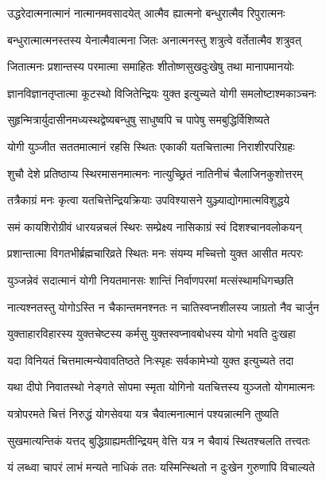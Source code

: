 \twolineshloka
{उद्धरेदात्मनात्मानं नात्मानमवसादयेत्}
{आत्मैव ह्यात्मनो बन्धुरात्मैव रिपुरात्मनः}%

\twolineshloka
{बन्धुरात्मात्मनस्तस्य येनात्मैवात्मना जितः}
{अनात्मनस्तु शत्रुत्वे वर्तेतात्मैव शत्रुवत्}%

\twolineshloka
{जितात्मनः प्रशान्तस्य परमात्मा समाहितः}
{शीतोष्णसुखदुःखेषु तथा मानापमानयोः}%

\twolineshloka
{ज्ञानविज्ञानतृप्तात्मा कूटस्थो विजितेन्द्रियः}
{युक्त इत्युच्यते योगी समलोष्टाश्मकाञ्चनः}%

\twolineshloka
{सुहृन्मित्रार्युदासीनमध्यस्थद्वेष्यबन्धुषु}
{साधुष्वपि च पापेषु समबुद्धिर्विशिष्यते}%

\twolineshloka
{योगी युञ्जीत सततमात्मानं रहसि स्थितः}
{एकाकी यतचित्तात्मा निराशीरपरिग्रहः}%

\twolineshloka
{शुचौ देशे प्रतिष्ठाप्य स्थिरमासनमात्मनः}
{नात्युच्छ्रितं नातिनीचं चैलाजिनकुशोत्तरम्}%

\twolineshloka
{तत्रैकाग्रं मनः कृत्वा यतचित्तेन्द्रियक्रियाः}
{उपविश्यासने युञ्ज्याद्योगमात्मविशुद्धये}%

\twolineshloka
{समं कायशिरोग्रीवं धारयन्नचलं स्थिरः}
{सम्प्रेक्ष्य नासिकाग्रं स्वं दिशश्चानवलोकयन्}%

\twolineshloka
{प्रशान्तात्मा विगतभीर्ब्रह्मचारिव्रते स्थितः}
{मनः संयम्य मच्चित्तो युक्त आसीत मत्परः}%

\twolineshloka
{युञ्जन्नेवं सदात्मानं योगी नियतमानसः}
{शान्तिं निर्वाणपरमां मत्संस्थामधिगच्छति}%

\twolineshloka
{नात्यश्नतस्तु योगोऽस्ति न चैकान्तमनश्नतः}
{न चातिस्वप्नशीलस्य जाग्रतो नैव चार्जुन}%

\twolineshloka
{युक्ताहारविहारस्य युक्तचेष्टस्य कर्मसु}
{युक्तस्वप्नावबोधस्य योगो भवति दुःखहा}%

\twolineshloka
{यदा विनियतं चित्तमात्मन्येवावतिष्ठते}
{निःस्पृहः सर्वकामेभ्यो युक्त इत्युच्यते तदा}%

\twolineshloka
{यथा दीपो निवातस्थो नेङ्गते सोपमा स्मृता}
{योगिनो यतचित्तस्य युञ्जतो योगमात्मनः}%

\twolineshloka
{यत्रोपरमते चित्तं निरुद्धं योगसेवया}
{यत्र चैवात्मनात्मानं पश्यन्नात्मनि तुष्यति}%

\twolineshloka
{सुखमात्यन्तिकं यत्तद् बुद्धिग्राह्यमतीन्द्रियम्}
{वेत्ति यत्र न चैवायं स्थितश्चलति तत्त्वतः}%

\twolineshloka
{यं लब्ध्वा चापरं लाभं मन्यते नाधिकं ततः}
{यस्मिन्स्थितो न दुःखेन गुरुणापि विचाल्यते}%

